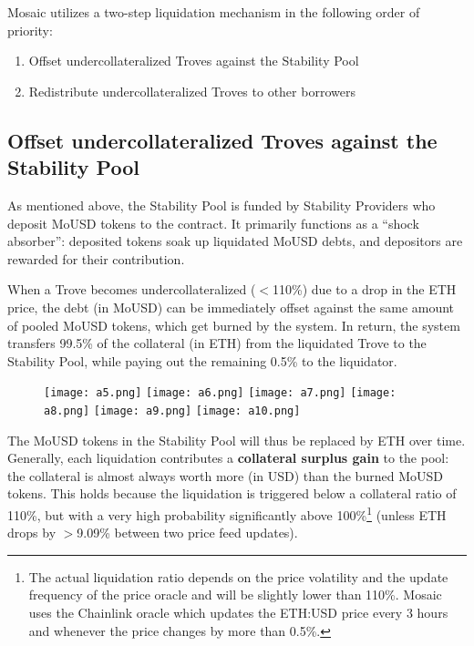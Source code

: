 \documentclass{article}
\begin{document}
Mosaic utilizes a two-step liquidation mechanism in the following order of priority:
\begin{enumerate}
    \item Offset undercollateralized Troves against the Stability Pool
    \item Redistribute undercollateralized Troves to other borrowers
\end{enumerate}

\subsection{Offset undercollateralized Troves against the Stability Pool}
As mentioned above, the Stability Pool is funded by Stability Providers who deposit MoUSD tokens to the contract. It primarily functions as a “shock absorber”: deposited tokens soak up liquidated MoUSD debts, and depositors are rewarded for their contribution. 

When a Trove becomes undercollateralized ($<$110\%) due to a drop in the ETH price, the debt (in MoUSD) can be immediately offset against the same amount of pooled MoUSD tokens, which get burned by the system. In return, the system transfers 99.5\% of the collateral (in ETH) from the liquidated Trove to the Stability Pool, while paying out the remaining 0.5\% to the liquidator.\\

\begin{figure}[h]
\centering
\texttt{[image: a5.png]}
\texttt{[image: a6.png]}
\texttt{[image: a7.png]}
\texttt{[image: a8.png]}
\texttt{[image: a9.png]}
\texttt{[image: a10.png]}
\end{figure}

The MoUSD tokens in the Stability Pool will thus be replaced by ETH over time. Generally, each liquidation contributes a \textbf{collateral surplus gain} to the pool: the collateral is almost always worth more (in USD) than the burned MoUSD tokens. This holds because the liquidation is triggered below a collateral ratio of 110\%, but with a very high probability significantly above 100\%\footnote{The actual liquidation ratio depends on the price volatility and the update frequency of the price oracle and will be slightly lower than 110\%. Mosaic uses the Chainlink oracle which updates the ETH:USD price every 3 hours and whenever the price changes by more than 0.5\%.} (unless ETH drops by $>$9.09\% between two price feed updates).
\end{document}
